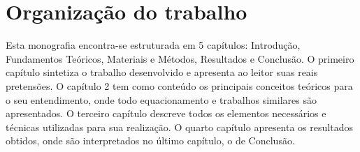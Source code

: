 \section{Organização do trabalho}

Esta monografia encontra-se estruturada em 5 capítulos: Introdução, Fundamentos Teóricos, Materiais e Métodos, Resultados e Conclusão. O primeiro capítulo sintetiza o trabalho desenvolvido e apresenta ao leitor suas reais pretensões. O capítulo 2 tem como conteúdo os principais conceitos teóricos para o seu entendimento, onde todo equacionamento e trabalhos similares são apresentados. O terceiro capítulo descreve todos os elementos necessários e técnicas utilizadas para sua realização. O quarto capítulo apresenta os resultados obtidos, onde são interpretados no último capítulo, o de Conclusão.